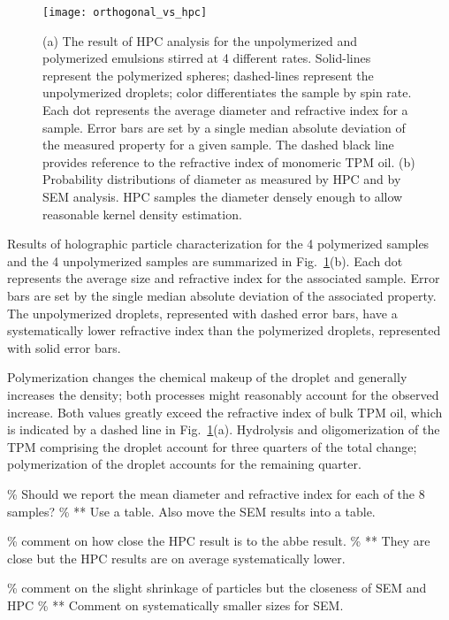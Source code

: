 \begin{figure}
    \centering
    \texttt{[image: orthogonal\_vs\_hpc]}
    \caption{(a) The result of HPC analysis for the unpolymerized and polymerized
      emulsions stirred at \num{4} different rates. Solid-lines represent the polymerized
      spheres; dashed-lines represent the unpolymerized droplets; color differentiates the sample by
      spin rate. Each dot represents the
      average diameter and refractive index for a sample. Error bars are set by a single
      median absolute deviation of the measured property for a given sample. The dashed
      black line provides reference to the refractive index of monomeric TPM oil. (b) Probability
      distributions of diameter as measured by HPC and by SEM analysis. HPC samples the diameter
      densely enough to allow reasonable kernel density estimation.}
    \label{fig:hpc_stir_rate}
\end{figure}


Results of holographic particle characterization for the \num{4} polymerized samples
and the \num{4} unpolymerized samples are summarized in Fig.~\ref{fig:hpc_stir_rate}(b).
Each dot represents the average size and refractive index for the associated sample.
Error bars are set by the single median absolute deviation of the associated property.
The unpolymerized droplets, represented with dashed error bars, have a systematically
lower refractive index than the polymerized droplets, represented with solid error bars.

Polymerization changes the chemical makeup of the droplet and generally increases the
density; %
both processes might reasonably account for the observed increase.
Both values greatly exceed the refractive index of bulk TPM oil, which is indicated by
a dashed line in Fig.~\ref{fig:hpc_stir_rate}(a).
Hydrolysis and oligomerization of the TPM comprising the droplet account for three quarters of
the total change; polymerization of the droplet accounts for the remaining quarter.

\% Should we report the mean diameter and refractive index for each of the 8 samples?
\%  ** Use a table. Also move the SEM results into a table.

\% comment on how close the HPC result is to the abbe result.
\%  ** They are close but the HPC results are on average systematically lower.

\% comment on the slight shrinkage of particles but the closeness of SEM and HPC
\%  ** Comment on systematically smaller sizes for SEM.

